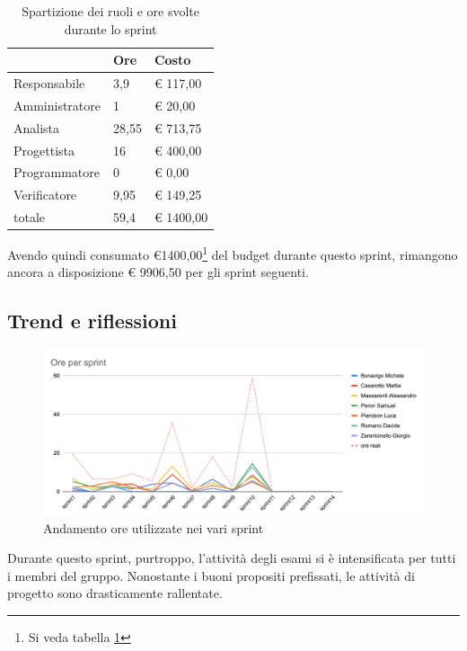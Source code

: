 \begin{table}[ht]
    \begin{tabularx}{\linewidth}{X|l|l}
    \rowcolor{gray!30}& Ore & Costo \\
    \hline
    
    Responsabile & 3,9 & € 117,00 \\
    \rowcolor{gray!10}Amministratore & 1 & € 20,00 \\
    Analista & 28,55 & € 713,75 \\
    \rowcolor{gray!10}Progettista & 16 & € 400,00 \\
    Programmatore & 0 & € 0,00 \\
    \rowcolor{gray!10}Verificatore & 9,95 &€ 149,25 \\
    totale & 59,4 & € 1400,00 \\
    \end{tabularx}
    \caption{\label{costi-ruolo}Spartizione dei ruoli e ore svolte durante lo sprint}
\end{table}

Avendo quindi consumato €1400,00\footnote{Si veda tabella \ref{costi-ruolo}} del budget durante questo sprint, rimangono ancora a disposizione € 9906,50 per gli sprint seguenti.

\subsection{Trend e riflessioni}\label{subsec:trend}

\begin{figure}[H]
    \includegraphics[width=\linewidth]{img/andamento.png}
    \caption{Andamento ore utilizzate nei vari sprint}\label{img:andamento}
\end{figure}

Durante questo sprint, purtroppo, l'attività degli esami si è intensificata per tutti i membri del gruppo. Nonostante i buoni propositi prefissati, le attività di progetto sono drasticamente rallentate.

